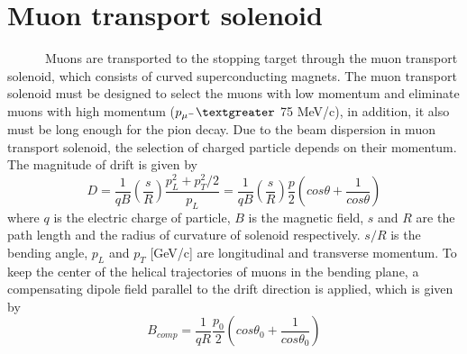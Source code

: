  \section{Muon transport solenoid}
~~~~~~Muons are transported to the stopping target through the muon transport solenoid, which consists of curved superconducting magnets.
The muon transport solenoid must be designed to select the muons with low momentum and eliminate muons with high momentum ($p_{\mu^-} \textgreater$ 75 MeV/c), in addition, it also must be long enough for the pion decay.
Due to the beam dispersion in muon transport solenoid, the selection of charged particle depends on their momentum.
The magnitude of drift is given by
\begin{equation}
 D = \frac{1}{qB}(\frac{s}{R})\frac{p_L^2 + p_T^2/2}{p_L} = \frac{1}{qB}(\frac{s}{R})\frac{p}{2}(cos\theta + \frac{1}{cos\theta})
\end{equation}
where $q$ is the electric charge of particle, $B$ is the magnetic field, $s$ and $R$ are the path length and the radius of curvature of solenoid respectively.
$s/R$ is the bending angle, $p_L$ and $p_T$ [GeV/c] are longitudinal and transverse momentum.
To keep the center of the helical trajectories of muons in the bending plane, a compensating dipole field parallel to the drift direction is applied, which is given by
\begin{equation}
 B_{comp} = \frac{1}{qR} \frac{p_0}{2} (cos\theta_0 + \frac{1}{cos\theta_0})
\end{equation}

